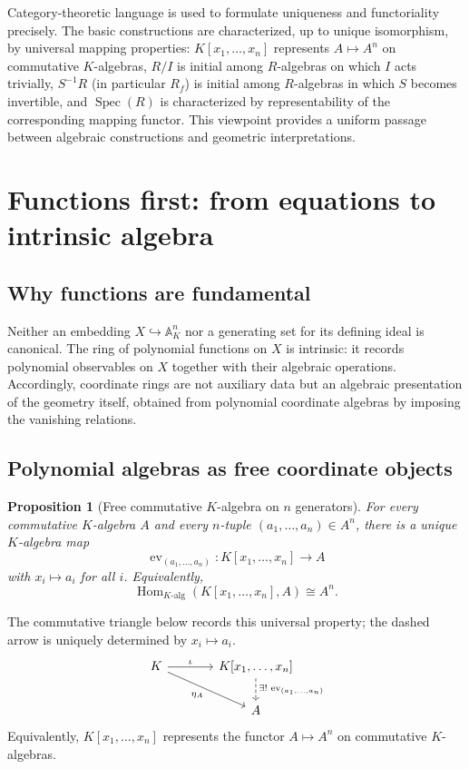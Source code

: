 \documentclass[12pt, a4paper]{article}
\newtheorem{proposition}[theorem]{Proposition}
\theoremstyle{definition}
\DeclareMathOperator{\Spec}{Spec}
\DeclareMathOperator{\Hom}{Hom}
\newcommand{\A}{\mathbb{A}}
\begin{document}
Category-theoretic language is used to formulate uniqueness and functoriality precisely. The basic constructions are characterized, up to unique isomorphism, by universal mapping properties: $K[x_1,\dots,x_n]$ represents $A\mapsto A^n$ on commutative $K$-algebras, $R/I$ is initial among $R$-algebras on which $I$ acts trivially, $S^{-1}R$ (in particular $R_f$) is initial among $R$-algebras in which $S$ becomes invertible, and $\Spec(R)$ is characterized by representability of the corresponding mapping functor. This viewpoint provides a uniform passage between algebraic constructions and geometric interpretations.

\section{Functions first: from equations to intrinsic algebra}

\subsection{Why functions are fundamental}

Neither an embedding $X\hookrightarrow \A_K^n$ nor a generating set for its defining ideal is canonical. The ring of polynomial functions on $X$ is intrinsic: it records polynomial observables on $X$ together with their algebraic operations. Accordingly, coordinate rings are not auxiliary data but an algebraic presentation of the geometry itself, obtained from polynomial coordinate algebras by imposing the vanishing relations.

\subsection{Polynomial algebras as free coordinate objects}

\begin{proposition}[Free commutative $K$-algebra on $n$ generators]
For every commutative $K$-algebra $A$ and every $n$-tuple $(a_1,\dots,a_n)\in A^n$, there is a unique $K$-algebra map
\[
\operatorname{ev}_{(a_1,\dots,a_n)}:K[x_1,\dots,x_n]\longrightarrow A
\]
with $x_i\mapsto a_i$ for all $i$.
Equivalently,
\[
\boxed{\Hom_{K\text{-alg}}(K[x_1,\dots,x_n],A)\cong A^n.}
\]
\end{proposition}

The commutative triangle below records this universal property; the dashed arrow is uniquely determined by $x_i\mapsto a_i$.
\[
\begin{tikzcd}[column sep=large]
K \arrow[r, "\iota"] \arrow[dr, "\eta_A"'] & K[x_1,\dots,x_n] \arrow[d, dashed, "\exists!\,\operatorname{ev}_{(a_1,\dots,a_n)}"] \\
& A
\end{tikzcd}
\]
Equivalently, $K[x_1,\dots,x_n]$ represents the functor $A\mapsto A^n$ on commutative $K$-algebras.
\end{document}
